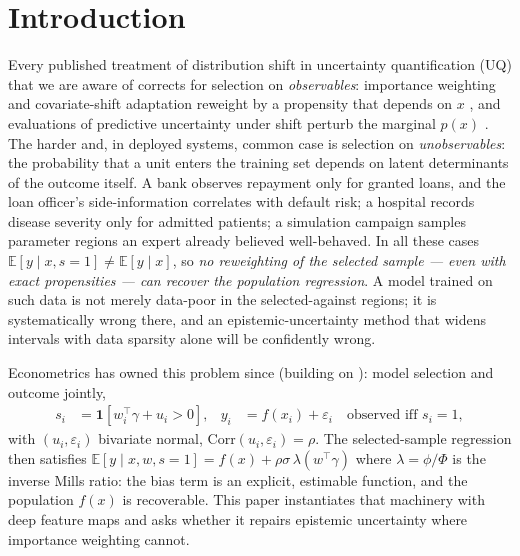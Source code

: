 \documentclass[10pt]{article}
\newcommand{\E}{\mathbb{E}}
\newcommand{\IMR}{\lambda}
\begin{document}
\section{Introduction}
\label{sec:intro}

Every published treatment of distribution shift in uncertainty
quantification (UQ) that we are aware of corrects for selection on
\emph{observables}: importance weighting and covariate-shift adaptation
reweight by a propensity that depends on $x$
\citep{shimodaira2000,sugiyama2007,cortes2008}, and evaluations of
predictive uncertainty under shift perturb the marginal $p(x)$
\citep{ovadia2019}. The harder and, in deployed systems, common case is
selection on \emph{unobservables}: the probability that a unit enters the
training set depends on latent determinants of the outcome itself. A bank
observes repayment only for granted loans, and the loan officer's
side-information correlates with default risk; a hospital records disease
severity only for admitted patients; a simulation campaign samples
parameter regions an expert already believed well-behaved. In all these
cases $\E[y \mid x, s{=}1] \neq \E[y \mid x]$, so \emph{no reweighting of
the selected sample --- even with exact propensities --- can recover the
population regression}. A model trained on such data is not merely
data-poor in the selected-against regions; it is systematically wrong
there, and an epistemic-uncertainty method that widens intervals with
data sparsity alone will be confidently wrong.

Econometrics has owned this problem since \citet{heckman1979} (building
on \citealp{tobin1958,heckman1974}): model selection and outcome jointly,
\begin{align}
s_i &= \mathbf{1}\!\left[w_i^\top\gamma + u_i > 0\right], &
y_i &= f(x_i) + \varepsilon_i \quad \text{observed iff } s_i = 1,
\label{eq:heckman}
\end{align}
with $(u_i, \varepsilon_i)$ bivariate normal, $\mathrm{Corr}(u_i,
\varepsilon_i) = \rho$. The selected-sample regression then satisfies
$\E[y \mid x, w, s{=}1] = f(x) + \rho\sigma\,\IMR(w^\top\gamma)$ where
$\IMR = \phi/\Phi$ is the inverse Mills ratio: the bias term is an
explicit, estimable function, and the population $f(x)$ is recoverable.
This paper instantiates that machinery with deep feature maps and asks
whether it repairs epistemic uncertainty where importance weighting
cannot.
\end{document}
